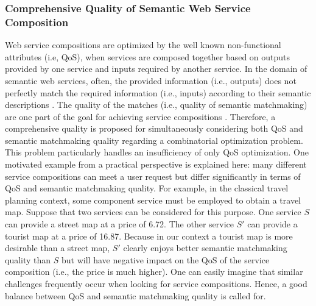 \subsubsection{Comprehensive Quality of Semantic Web Service Composition}\label{SC:hybridisation}
Web service compositions are optimized by the well known non-functional attributes (i.e, QoS), when services are composed together based on outputs provided by one service and inputs required by another service. In the domain of semantic web services, often, the provided information (i.e., outputs) does not perfectly match the required information (i.e., inputs) according to their semantic descriptions \cite{lecue2008optimizing}. The quality of the matches (i.e., quality of semantic matchmaking) are one part of the goal for achieving service compositions \cite{lecue2009optimizing}. Therefore, a comprehensive quality is proposed for simultaneously considering both QoS and semantic matchmaking quality regarding a combinatorial optimization problem. This problem particularly handles an insufficiency of only QoS optimization. One motivated example from a practical perspective is explained here: many different service compositions can meet a user request but differ significantly in terms of QoS and semantic matchmaking quality. For example, in the classical travel planning context, some component service must be employed to obtain a travel map. Suppose that two services can be considered for this purpose. One service $S$ can provide a street map at a price of 6.72. The other service $S'$ can provide a tourist map at a price of 16.87. Because in our context a tourist map is more desirable than a street map, $S'$ clearly enjoys better semantic matchmaking quality than $S$ but will have negative impact on the QoS of the service composition (i.e., the price is much higher). One can easily imagine that similar challenges frequently occur when looking for service compositions. Hence, a good balance between QoS and semantic matchmaking quality is called for.

